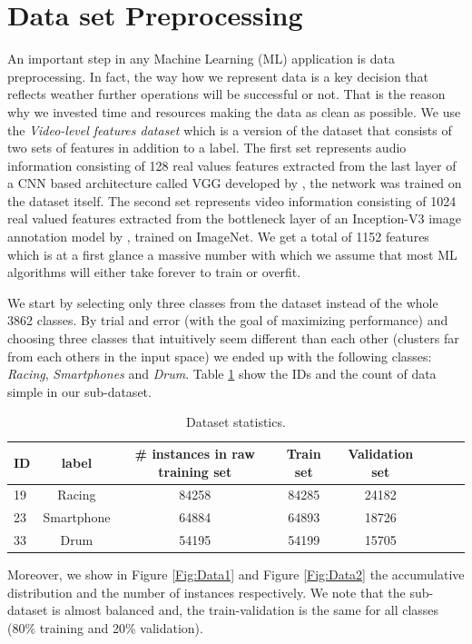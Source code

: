 \documentclass{article}
\begin{document}
\section{Data set Preprocessing}

An important step in any Machine Learning (ML) application is data preprocessing. In fact, the way how we represent data is a key decision that reflects weather further operations will be successful or not. That is the reason why we invested time and resources making the data as clean as possible.
We use the \emph{Video-level features dataset} which is a version of the dataset that consists of two sets of features in addition to a label. The first set represents audio information consisting of 128 real values features extracted from the last layer of a CNN based architecture called VGG developed by \cite{simonyan2014very}, the network was trained on the dataset itself. The second set represents video information consisting of 1024 real valued features extracted from the bottleneck layer of an Inception-V3 image annotation model by \cite{szegedy2016rethinking}, trained on ImageNet. We get a total of 1152 features which is at a first glance a massive number with which we assume that most ML algorithms will either take forever to train or overfit.

We start by selecting only three classes from the dataset instead of the whole 3862 classes. By trial and error (with the goal of maximizing performance) and choosing three classes that intuitively seem different than each other (clusters far from each others in the input space) we ended up with the following classes: \emph{Racing}, \emph{Smartphones} and \emph{Drum}. Table \ref{tab:stats} show the IDs and the count of data simple in our sub-dataset.

\begin{table}
\center
\begin{tabular}{l*{6}{c}r}
ID           & label & \# instances in raw training set & Train set & Validation set \\
\hline
19 			 & Racing & 84258 & 84285 & 24182 \\
23          & Smartphone & 64884 & 64893  & 18726 \\
33          & Drum & 54195 & 54199 & 15705 \\
\end{tabular}
\caption{Dataset statistics.}
\label{tab:stats}
\end{table}

Moreover, we show in Figure \ref{Fig:Data1} and Figure \ref{Fig:Data2} the accumulative distribution and the number of instances respectively. We note that the sub-dataset is almost balanced and, the train-validation is the same for all classes (80\% training and 20\% validation).
\end{document}
